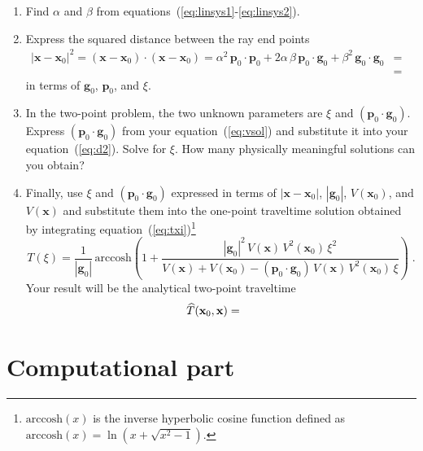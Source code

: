 \begin{enumerate}
\begin{enumerate}
\item Find $\alpha$ and $\beta$ from
  equations~(\ref{eq:linsys1}-\ref{eq:linsys2}).
\item Express the squared distance between the ray end points
  \begin{eqnarray}
  \nonumber
    |\mathbf{x} - \mathbf{x}_0|^2 = (\mathbf{x} - \mathbf{x}_0) \cdot (\mathbf{x} - \mathbf{x}_0) =
    \alpha^2\,\mathbf{p}_0 \cdot \mathbf{p}_0 + 2 \alpha\,\beta\,\mathbf{p}_0 \cdot \mathbf{g}_0 +
    \beta^2\,\mathbf{g}_0 \cdot \mathbf{g}_0 & = & \\
    & = & 
    \label{eq:d2} 
  \end{eqnarray}
  in terms of $\mathbf{g}_0$, $\mathbf{p}_0$, and $\xi$. 
\item In the two-point problem, the two unknown
  parameters are $\xi$ and $(\mathbf{p}_0 \cdot \mathbf{g}_0)$.
  Express $(\mathbf{p}_0 \cdot \mathbf{g}_0)$ from your
  equation~(\ref{eq:vsol}) and substitute it into your
  equation~(\ref{eq:d2}). Solve for $\xi$. How many physically
  meaningful solutions can you obtain?
\item Finally, use $\xi$ and $(\mathbf{p}_0 \cdot \mathbf{g}_0)$ 
  expressed in terms of $|\mathbf{x} - \mathbf{x}_0|$,
  $|\mathbf{g}_0|$, $V(\mathbf{x}_0)$, and $V(\mathbf{x})$ and
  substitute them into the one-point traveltime solution obtained by
  integrating equation~(\ref{eq:txi})\footnote{$\mbox{arccosh}(x)$ is
  the inverse hyperbolic cosine function defined as $\mbox{arccosh}(x)
  = \ln\left(x + \sqrt{x^2-1}\right)$.}  
  \begin{equation}
  \label{eq:t1} T(\xi) =
  \frac{1}{|\mathbf{g}_0|}\,\mbox{arccosh}\left(1 +
  \frac{|\mathbf{g}_0|^2\,V(\mathbf{x})\,V^2(\mathbf{x}_0)\,\xi^2}
  {V(\mathbf{x})+V(\mathbf{x}_0) - (\mathbf{p}_0 \cdot
  \mathbf{g}_0)\,V(\mathbf{x})\,V^2(\mathbf{x}_0)\,\xi}\right)\;.
  \end{equation} 
Your result will be the analytical two-point
  traveltime \begin{eqnarray} \label{eq:t2}
  \widehat{T}(\mathbf{x}_0,\mathbf{x}) = & & \hfill \ \end{eqnarray}
\end{enumerate}
\end{enumerate}

\newpage

\section{Computational part}



